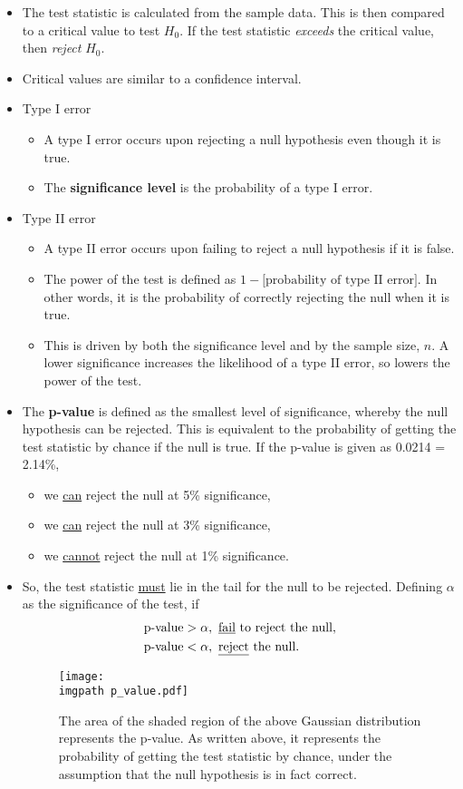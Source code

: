 \documentclass[../notes_compiled.tex]{subfiles}
\begin{document}
\begin{itemize}
\item The test statistic is calculated from the sample data. This is then compared to a critical value to test $H_{0}$. If the test statistic \emph{exceeds} the critical value, then \emph{reject} $H_{0}$.
\item Critical values are similar to a confidence interval.

\item Type I error
\begin{itemize}
\item[] A type I error occurs upon rejecting a null hypothesis even though it is true.
\item[] The \textbf{significance level} is the probability of a type I error.
\end{itemize}
\item Type II error
\begin{itemize}
\item[] A type II error occurs upon failing to reject a null hypothesis if it is false.
\item[] The power of the test is defined as $1-\text{[probability of type II error]}$. In other words, it is the probability of correctly rejecting the null when it is true. 
\item[] This is driven by both the significance level and by the sample size, $n$. A lower significance increases the likelihood of a type II error, so lowers the power of the test.
\end{itemize}
\item The \textbf{p-value} is defined as the smallest level of significance, whereby the null hypothesis can be rejected. This is equivalent to the probability of getting the test statistic by chance if the null is true. If the p-value is given as 0.0214 = 2.14\%, 
\begin{itemize}
\item[] we \underline{can} reject the null at 5\% significance,
\item[] we \underline{can} reject the null at 3\% significance,
\item[] we \underline{cannot} reject the null at 1\% significance.
\end{itemize}
\item[] So, the test statistic \underline{must} lie in the tail for the null to be rejected. Defining $\alpha$ as the significance of the test, if
\begin{align*}
\text{p-value}&>\alpha, \text{ \underline{fail} to reject the null}, \\
\text{p-value}&<\alpha, \text{ \underline{reject} the null}.
\end{align*}

\begin{figure}[h]
  \centering
  \texttt{[image: \\imgpath p\_value.pdf]}
  \caption{The area of the shaded region of the above Gaussian distribution represents the p-value. As written above, it represents the probability of getting the test statistic by chance, under the assumption that the null hypothesis is in fact correct.}
\end{figure}


\end{itemize}
\end{document}
